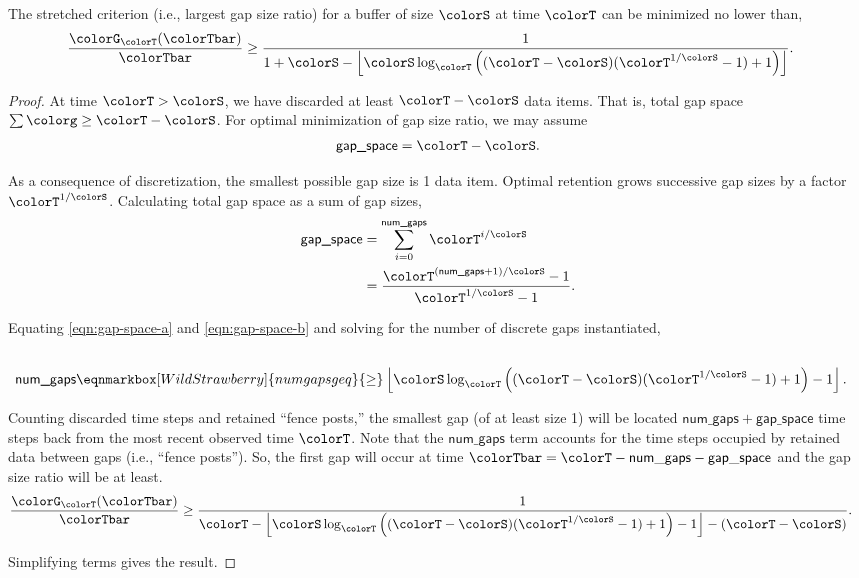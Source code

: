 \begin{lemma}
\label{thm:stretched-ideal-strict}
The stretched criterion (i.e., largest gap size ratio) for a buffer of size $\colorS$ at time $\colorT$ can be minimized no lower than,
\begin{align*}
\frac{\colorG_{\colorT}(\colorTbar)}{\colorTbar}
&\geq
\frac{
  1
}{
  1 + \colorS
  - \left\lfloor \colorS \log_{\colorT}\Big(
    (\colorT - \colorS)(\colorT^{1/\colorS} - 1) + 1
  \Big)\right\rfloor
}.
\end{align*}
\end{lemma}

\begin{proof}
At time $\colorT > \colorS$, we have discarded at least $\colorT - \colorS$ data items.
That is, total gap space $\sum \colorg \geq \colorT - \colorS$.
For optimal minimization of gap size ratio, we may assume
\begin{align}
\textsf{gap\_space} = \colorT - \colorS.
\label{eqn:gap-space-a}
\end{align}

As a consequence of discretization, the smallest possible gap size is 1 data item.
Optimal retention grows successive gap sizes by a factor $\colorT^{1/\colorS}$.
Calculating total gap space as a sum of gap sizes,
\begin{align}
\textsf{gap\_space}
&=
\sum_{i = 0}^{\textsf{num\_gaps}} \colorT^{i/\colorS} %
\nonumber \\
&=
\frac{
  \colorT^{(\textsf{num\_gaps} + 1)/\colorS} - 1
}{
  \colorT^{1/\colorS} - 1
}.
\label{eqn:gap-space-b}
\end{align}

Equating \ref{eqn:gap-space-a} and \ref{eqn:gap-space-b} and solving for the number of discrete gaps instantiated,
\begin{align*}
\\
\textsf{num\_gaps}
&\eqnmarkbox[WildStrawberry]{numgapsgeq}{\geq}
\left\lfloor
\colorS \log_{\colorT}\Big(
  (\colorT - \colorS)(\colorT^{1/\colorS} - 1) + 1
\Big) - 1
\right\rfloor.
\end{align*}


Counting discarded time steps and retained ``fence posts,'' the smallest gap (of at least size 1) will be located $\mathsf{num\_gaps} + \mathsf{gap\_space}$ time steps back from the most recent observed time $\colorT$.
Note that the $\mathsf{num\_gaps}$ term accounts for the time steps occupied by retained data between gaps (i.e., ``fence posts'').
So, the first gap will occur at time $\colorTbar = \colorT - \mathsf{num\_gaps} - \mathsf{gap\_space}$ and the gap size ratio will be at least.
\begin{align*}
\frac{\colorG_{\colorT}(\colorTbar)}{\colorTbar}
&\geq
\frac{1}{
\colorT
- \left\lfloor
\colorS \log_{\colorT}\Big(
  (\colorT - \colorS)(\colorT^{1/\colorS} - 1) + 1
\Big) - 1
\right\rfloor - (\colorT - \colorS)
}.
\end{align*}

Simplifying terms gives the result.
\end{proof}
